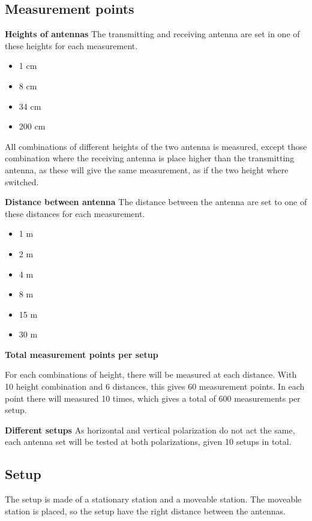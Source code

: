 \subsection*{Measurement points}

\textbf{Heights of antennas}
The transmitting and receiving antenna are set in one of these heights for each measurement. 

\begin{itemize}
\item 1 cm
\item 8 cm
\item 34 cm
\item 200 cm
\end{itemize}

All combinations of different heights of the two antenna is measured, except those combination where the receiving antenna is place higher than the transmitting antenna, as these will give the same measurement, as if the two height where switched.

\textbf{Distance between antenna}
The distance between the antenna are set to one of these distances for each measurement.

\begin{itemize}
\item 1 m
\item 2 m
\item 4 m
\item 8 m
\item 15 m
\item 30 m
\end{itemize}

\textbf{Total measurement points per setup}

For each combinations of height, there will be measured at each distance. With 10 height combination and 6 distances, this gives 60 measurement points. In each point there will measured 10 times, which gives a total of 600 measurements per setup.

\textbf{Different setups}
As horizontal and vertical polarization do not act the same, each antenna set will be tested at both polarizations, given 10 setups in total.

\subsection*{Setup}
The setup is made of a stationary station and a moveable station. The moveable station is placed, so the setup have the right distance between the antennas.

